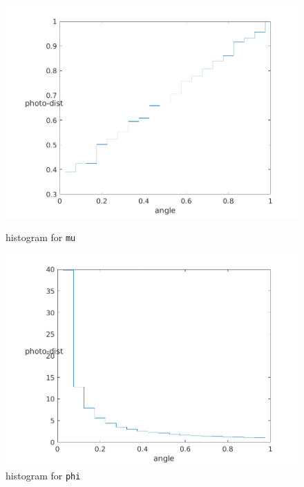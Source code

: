 \documentclass[../main/main.tex]{subfiles}
\begin{document}
\begin{figure}[!htp]
\centering
\begin{minipage}{.5\textwidth}
\includegraphics[width=\textwidth]{../../introductory_exercises/limb_darkening/number_channels20number_photons100000max_opt_depth10.png}
\caption{histogram for \texttt{mu}}
\label{3D_mu}
\end{minipage}%
\begin{minipage}{.5\textwidth}
\includegraphics[width=\textwidth]{../../introductory_exercises/limb_darkening/PHI_number_channels20number_photons100000max_opt_depth10.png}
\caption{histogram for \texttt{phi}}
\label{3D_phi}
\end{minipage}
\end{figure}
\end{document}
